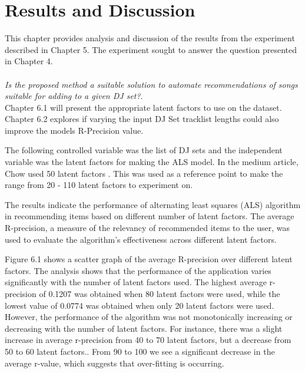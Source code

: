
\graphicspath{{Chapter6/}}

\chapter{Results and Discussion}

This chapter provides analysis and discussion of the results from the experiment described
in Chapter 5. The experiment sought to answer the question presented in Chapter 4.
\\
\\
\textit{Is the proposed method a suitable solution to automate recommendations of songs suitable for adding to a given DJ set?}.
\\

Chapter 6.1 will present the appropriate latent factors to use on the dataset. Chapter 6.2 explores if varying the input DJ Set tracklist lengths could also improve the models R-Precision value.

The following controlled variable was the list of DJ sets and the independent variable was the latent factors for making the ALS model. In the medium article, Chow used 50 latent factors \citep{chow_music_2020}. This was used as a reference point to make the range from 20 - 110 latent factors to experiment on.

The results indicate the performance of alternating least squares (ALS) algorithm in recommending items based on different number of latent factors. The average R-precision, a measure of the relevancy of recommended items to the user, was used to evaluate the algorithm's effectiveness across different latent factors.

Figure 6.1 shows a scatter graph of the average R-precision over different latent factors. The analysis shows that the performance of the application varies significantly with the number of latent factors used. The highest average r-precision of 0.1207 was obtained when 80 latent factors were used, while the lowest value of 0.0774 was obtained when only 20 latent factors were used. However, the performance of the algorithm was not monotonically increasing or decreasing with the number of latent factors. For instance, there was a slight increase in average r-precision from 40 to 70 latent factors, but a decrease from 50 to 60 latent factors.. From 90 to 100 we see a significant decrease in the average r-value, which suggests that over-fitting is occurring.

